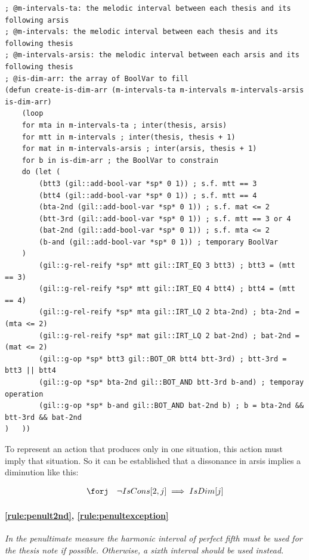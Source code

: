 \begin{lstlisting}[caption=Function that constrains $IsDim$ to reprensent diminutions., label=lst:dimin, basicstyle=\ttfamily\scriptsize]
; @m-intervals-ta: the melodic interval between each thesis and its following arsis
; @m-intervals: the melodic interval between each thesis and its following thesis
; @m-intervals-arsis: the melodic interval between each arsis and its following thesis
; @is-dim-arr: the array of BoolVar to fill
(defun create-is-dim-arr (m-intervals-ta m-intervals m-intervals-arsis is-dim-arr)
    (loop
    for mta in m-intervals-ta ; inter(thesis, arsis)
    for mtt in m-intervals ; inter(thesis, thesis + 1)
    for mat in m-intervals-arsis ; inter(arsis, thesis + 1)
    for b in is-dim-arr ; the BoolVar to constrain
    do (let (
        (btt3 (gil::add-bool-var *sp* 0 1)) ; s.f. mtt == 3
        (btt4 (gil::add-bool-var *sp* 0 1)) ; s.f. mtt == 4
        (bta-2nd (gil::add-bool-var *sp* 0 1)) ; s.f. mat <= 2
        (btt-3rd (gil::add-bool-var *sp* 0 1)) ; s.f. mtt == 3 or 4
        (bat-2nd (gil::add-bool-var *sp* 0 1)) ; s.f. mta <= 2
        (b-and (gil::add-bool-var *sp* 0 1)) ; temporary BoolVar
    )
        (gil::g-rel-reify *sp* mtt gil::IRT_EQ 3 btt3) ; btt3 = (mtt == 3)
        (gil::g-rel-reify *sp* mtt gil::IRT_EQ 4 btt4) ; btt4 = (mtt == 4)
        (gil::g-rel-reify *sp* mta gil::IRT_LQ 2 bta-2nd) ; bta-2nd = (mta <= 2)
        (gil::g-rel-reify *sp* mat gil::IRT_LQ 2 bat-2nd) ; bat-2nd = (mat <= 2)
        (gil::g-op *sp* btt3 gil::BOT_OR btt4 btt-3rd) ; btt-3rd = btt3 || btt4
        (gil::g-op *sp* bta-2nd gil::BOT_AND btt-3rd b-and) ; temporay operation
        (gil::g-op *sp* b-and gil::BOT_AND bat-2nd b) ; b = bta-2nd && btt-3rd && bat-2nd
)   ))
\end{lstlisting}

To represent an action that produces only in one situation, this action must imply that situation. So it can be established that a dissonance in arsis implies a diminution like this:

\begin{equation}
    \begin{gathered}
        \forj \quad
        \lnot IsCons[2, j] \implies IsDim[j]
    \end{gathered}
\end{equation}

\paragraph{\ref{rule:penult2nd}, \ref{rule:penultexception}} \textit{In the penultimate measure the harmonic interval of perfect fifth must be used for the thesis note if possible. Otherwise, a sixth interval should be used instead.}

